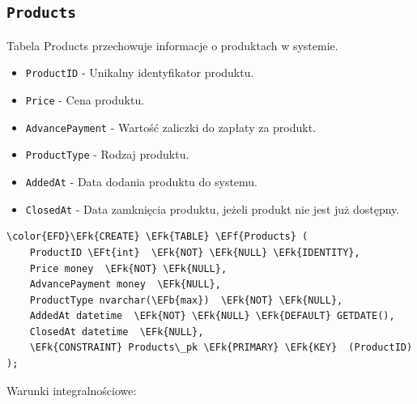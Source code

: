 \documentclass[11pt]{article}
\newcommand{\EFk}[1]{\textcolor{EFk}{\textbf{#1}}} %
\newcommand{\EFb}[1]{\textcolor{EFb}{\textbf{#1}}} %
\newcommand{\EFf}[1]{\textcolor{EFf}{#1}} %
\newcommand{\EFt}[1]{\textcolor{EFt}{\textbf{#1}}} %
\begin{document}
\subsection{\texttt{Products}}
\label{sec:orgaa3b19e}
Tabela Products przechowuje informacje o produktach w systemie.
\begin{itemize}
\item \texttt{ProductID} - Unikalny identyfikator produktu.
\item \texttt{Price} - Cena produktu.
\item \texttt{AdvancePayment} - Wartość zaliczki do zapłaty za produkt.
\item \texttt{ProductType} - Rodzaj produktu.
\item \texttt{AddedAt} - Data dodania produktu do systemu.
\item \texttt{ClosedAt} - Data zamknięcia produktu, jeżeli produkt nie jest już dostępny.
\end{itemize}
\begin{Code}
\begin{Verbatim}
\color{EFD}\EFk{CREATE} \EFk{TABLE} \EFf{Products} (
    ProductID \EFt{int}  \EFk{NOT} \EFk{NULL} \EFk{IDENTITY},
    Price money  \EFk{NOT} \EFk{NULL},
    AdvancePayment money  \EFk{NULL},
    ProductType nvarchar(\EFb{max})  \EFk{NOT} \EFk{NULL},
    AddedAt datetime  \EFk{NOT} \EFk{NULL} \EFk{DEFAULT} GETDATE(),
    ClosedAt datetime  \EFk{NULL},
    \EFk{CONSTRAINT} Products\_pk \EFk{PRIMARY} \EFk{KEY}  (ProductID)
);
\end{Verbatim}
\end{Code}
Warunki integralnościowe:
\end{document}
